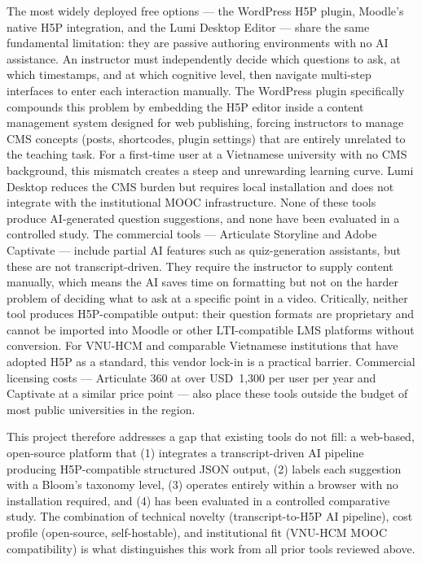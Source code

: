 The most widely deployed free options --- the WordPress H5P plugin, Moodle's native H5P integration, and the Lumi Desktop Editor --- share the same fundamental limitation: they are passive authoring environments with no AI assistance. An instructor must independently decide which questions to ask, at which timestamps, and at which cognitive level, then navigate multi-step interfaces to enter each interaction manually. The WordPress plugin specifically compounds this problem by embedding the H5P editor inside a content management system designed for web publishing, forcing instructors to manage CMS concepts (posts, shortcodes, plugin settings) that are entirely unrelated to the teaching task. For a first-time user at a Vietnamese university with no CMS background, this mismatch creates a steep and unrewarding learning curve. Lumi Desktop reduces the CMS burden but requires local installation and does not integrate with the institutional MOOC infrastructure. None of these tools produce AI-generated question suggestions, and none have been evaluated in a controlled study.
\clearpage
The commercial tools --- Articulate Storyline and Adobe Captivate --- include partial AI features such as quiz-generation assistants, but these are not transcript-driven. They require the instructor to supply content manually, which means the AI saves time on formatting but not on the harder problem of deciding what to ask at a specific point in a video. Critically, neither tool produces H5P-compatible output: their question formats are proprietary and cannot be imported into Moodle or other LTI-compatible LMS platforms without conversion. For VNU-HCM and comparable Vietnamese institutions that have adopted H5P as a standard, this vendor lock-in is a practical barrier. Commercial licensing costs --- Articulate 360 at over USD~1,300 per user per year and Captivate at a similar price point --- also place these tools outside the budget of most public universities in the region.

This project therefore addresses a gap that existing tools do not fill: a web-based, open-source platform that (1) integrates a transcript-driven AI pipeline producing H5P-compatible structured JSON output, (2) labels each suggestion with a Bloom's taxonomy level, (3) operates entirely within a browser with no installation required, and (4) has been evaluated in a controlled comparative study. The combination of technical novelty (transcript-to-H5P AI pipeline), cost profile (open-source, self-hostable), and institutional fit (VNU-HCM MOOC compatibility) is what distinguishes this work from all prior tools reviewed above.
